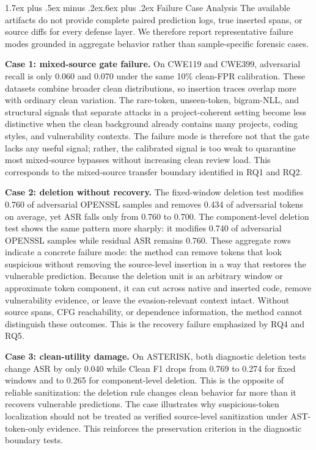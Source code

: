 \documentclass[letterpaper,twocolumn,10pt,twoside]{article}
\makeatletter
\renewcommand\subsection{\@startsection{subsection}{2}{\z@}%
  {1.7ex plus .5ex minus .2ex}{.6ex plus .2ex}%
  {\normalfont\normalsize\bfseries}}
\newcommand{\cleanf}{Clean F1}
\newcommand{\asrshort}{ASR}
\newcommand{\dataset}[1]{\textsc{#1}}
\makeatother
\begin{document}
\subsection{Failure Case Analysis}
The available artifacts do not provide complete paired prediction logs, true inserted spans, or source diffs for every defense layer. We therefore report representative failure modes grounded in aggregate behavior rather than sample-specific forensic cases.

\textbf{Case 1: mixed-source gate failure.} On \dataset{CWE119} and \dataset{CWE399}, adversarial recall is only 0.060 and 0.070 under the same 10\% clean-FPR calibration. These datasets combine broader clean distributions, so insertion traces overlap more with ordinary clean variation. The rare-token, unseen-token, bigram-NLL, and structural signals that separate attacks in a project-coherent setting become less distinctive when the clean background already contains many projects, coding styles, and vulnerability contexts. The failure mode is therefore not that the gate lacks any useful signal; rather, the calibrated signal is too weak to quarantine most mixed-source bypasses without increasing clean review load. This corresponds to the mixed-source transfer boundary identified in RQ1 and RQ2.

\textbf{Case 2: deletion without recovery.} The fixed-window deletion test modifies 0.760 of adversarial \dataset{OPENSSL} samples and removes 0.434 of adversarial tokens on average, yet \asrshort{} falls only from 0.760 to 0.700. The component-level deletion test shows the same pattern more sharply: it modifies 0.740 of adversarial \dataset{OPENSSL} samples while residual \asrshort{} remains 0.760. These aggregate rows indicate a concrete failure mode: the method can remove tokens that look suspicious without removing the source-level insertion in a way that restores the vulnerable prediction. Because the deletion unit is an arbitrary window or approximate token component, it can cut across native and inserted code, remove vulnerability evidence, or leave the evasion-relevant context intact. Without source spans, CFG reachability, or dependence information, the method cannot distinguish these outcomes. This is the recovery failure emphasized by RQ4 and RQ5.

\textbf{Case 3: clean-utility damage.} On \dataset{ASTERISK}, both diagnostic deletion tests change \asrshort{} by only 0.040 while \cleanf{} drops from 0.769 to 0.274 for fixed windows and to 0.265 for component-level deletion. This is the opposite of reliable sanitization: the deletion rule changes clean behavior far more than it recovers vulnerable predictions. The case illustrates why suspicious-token localization should not be treated as verified source-level sanitization under AST-token-only evidence. This reinforces the preservation criterion in the diagnostic boundary tests.
\end{document}
